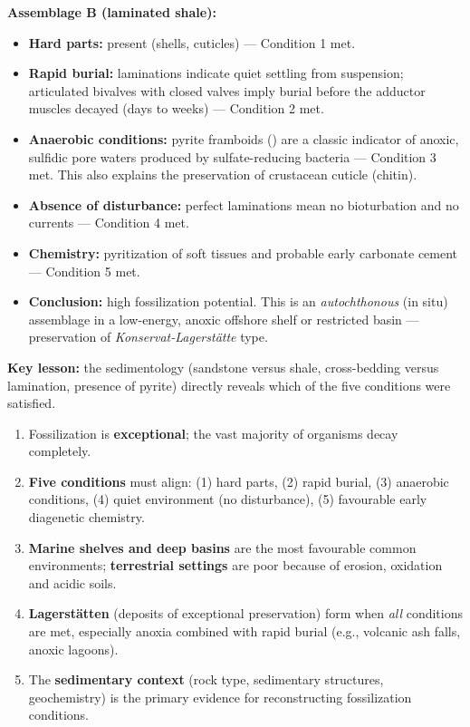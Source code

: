 \documentclass[11pt]{article}
\newcounter{popsec}
\newcounter{popsub}
\newcommand{\courssub}[1]{%
  \stepcounter{popsub}%
  \par\vspace{9pt}\noindent{\popxbold\fontsize{11.5}{13}\selectfont\color{popink}{\color{poporange}\thepopsec.\thepopsub}\hspace{6pt}#1}\par\nopagebreak\vspace{4pt}
}
\begin{document}
\begin{exoresolu}
\textbf{Assemblage B (laminated shale):}
\begin{itemize}
    \item \textbf{Hard parts:} present (shells, cuticles) — Condition 1 met.
    \item \textbf{Rapid burial:} laminations indicate quiet settling from suspension; articulated bivalves with closed valves imply burial before the adductor muscles decayed (days to weeks) — Condition 2 met.
    \item \textbf{Anaerobic conditions:} pyrite framboids () are a classic indicator of anoxic, sulfidic pore waters produced by sulfate-reducing bacteria — Condition 3 met. This also explains the preservation of crustacean cuticle (chitin).
    \item \textbf{Absence of disturbance:} perfect laminations mean no bioturbation and no currents — Condition 4 met.
    \item \textbf{Chemistry:} pyritization of soft tissues and probable early carbonate cement — Condition 5 met.
    \item \textbf{Conclusion:} high fossilization potential. This is an \emph{autochthonous} (in situ) assemblage in a low-energy, anoxic offshore shelf or restricted basin — preservation of \emph{Konservat-Lagerstätte} type.
\end{itemize}

\textbf{Key lesson:} the sedimentology (sandstone versus shale, cross-bedding versus lamination, presence of pyrite) directly reveals which of the five conditions were satisfied.
\end{exoresolu}

\courssub{Summary and Key Points}

\begin{aretenir}
\begin{enumerate}
    \item Fossilization is \textbf{exceptional}; the vast majority of organisms decay completely.
    \item \textbf{Five conditions} must align: (1) hard parts, (2) rapid burial, (3) anaerobic conditions, (4) quiet environment (no disturbance), (5) favourable early diagenetic chemistry.
    \item \textbf{Marine shelves and deep basins} are the most favourable common environments; \textbf{terrestrial settings} are poor because of erosion, oxidation and acidic soils.
    \item \textbf{Lagerstätten} (deposits of exceptional preservation) form when \emph{all} conditions are met, especially anoxia combined with rapid burial (e.g., volcanic ash falls, anoxic lagoons).
    \item The \textbf{sedimentary context} (rock type, sedimentary structures, geochemistry) is the primary evidence for reconstructing fossilization conditions.
\end{enumerate}
\end{aretenir}
\end{document}
